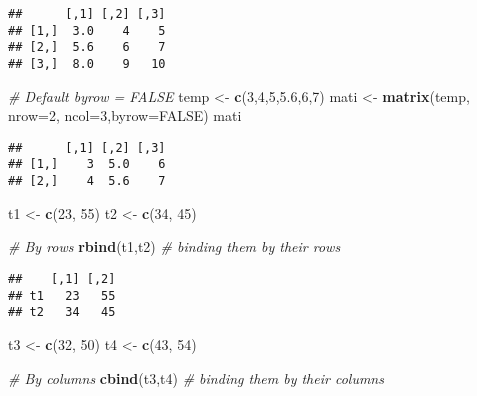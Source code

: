 \documentclass[
]{article}
\newenvironment{Shaded}{\begin{snugshade}}{\end{snugshade}}
\newcommand{\AttributeTok}[1]{\textcolor[rgb]{0.13,0.29,0.53}{#1}}
\newcommand{\CommentTok}[1]{\textcolor[rgb]{0.56,0.35,0.01}{\textit{#1}}}
\newcommand{\ConstantTok}[1]{\textcolor[rgb]{0.56,0.35,0.01}{#1}}
\newcommand{\DecValTok}[1]{\textcolor[rgb]{0.00,0.00,0.81}{#1}}
\newcommand{\FloatTok}[1]{\textcolor[rgb]{0.00,0.00,0.81}{#1}}
\newcommand{\FunctionTok}[1]{\textcolor[rgb]{0.13,0.29,0.53}{\textbf{#1}}}
\newcommand{\NormalTok}[1]{#1}
\newcommand{\OtherTok}[1]{\textcolor[rgb]{0.56,0.35,0.01}{#1}}
\begin{document}
\begin{verbatim}
##      [,1] [,2] [,3]
## [1,]  3.0    4    5
## [2,]  5.6    6    7
## [3,]  8.0    9   10
\end{verbatim}

\begin{Shaded}
\begin{Highlighting}[]
\CommentTok{\# Default byrow = FALSE}
\NormalTok{temp }\OtherTok{\textless{}{-}} \FunctionTok{c}\NormalTok{(}\DecValTok{3}\NormalTok{,}\DecValTok{4}\NormalTok{,}\DecValTok{5}\NormalTok{,}\FloatTok{5.6}\NormalTok{,}\DecValTok{6}\NormalTok{,}\DecValTok{7}\NormalTok{)}
\NormalTok{mati }\OtherTok{\textless{}{-}} \FunctionTok{matrix}\NormalTok{(temp, }\AttributeTok{nrow=}\DecValTok{2}\NormalTok{, }\AttributeTok{ncol=}\DecValTok{3}\NormalTok{,}\AttributeTok{byrow=}\ConstantTok{FALSE}\NormalTok{)}
\NormalTok{mati}
\end{Highlighting}
\end{Shaded}

\begin{verbatim}
##      [,1] [,2] [,3]
## [1,]    3  5.0    6
## [2,]    4  5.6    7
\end{verbatim}

\begin{Shaded}
\begin{Highlighting}[]
\NormalTok{t1 }\OtherTok{\textless{}{-}} \FunctionTok{c}\NormalTok{(}\DecValTok{23}\NormalTok{, }\DecValTok{55}\NormalTok{)}
\NormalTok{t2 }\OtherTok{\textless{}{-}} \FunctionTok{c}\NormalTok{(}\DecValTok{34}\NormalTok{, }\DecValTok{45}\NormalTok{)}

\CommentTok{\# By rows}
\FunctionTok{rbind}\NormalTok{(t1,t2) }\CommentTok{\# binding them by their rows}
\end{Highlighting}
\end{Shaded}

\begin{verbatim}
##    [,1] [,2]
## t1   23   55
## t2   34   45
\end{verbatim}

\begin{Shaded}
\begin{Highlighting}[]
\NormalTok{t3 }\OtherTok{\textless{}{-}} \FunctionTok{c}\NormalTok{(}\DecValTok{32}\NormalTok{, }\DecValTok{50}\NormalTok{)}
\NormalTok{t4 }\OtherTok{\textless{}{-}} \FunctionTok{c}\NormalTok{(}\DecValTok{43}\NormalTok{, }\DecValTok{54}\NormalTok{)}

\CommentTok{\# By columns}
\FunctionTok{cbind}\NormalTok{(t3,t4) }\CommentTok{\# binding them by their columns}
\end{Highlighting}
\end{Shaded}
\end{document}
